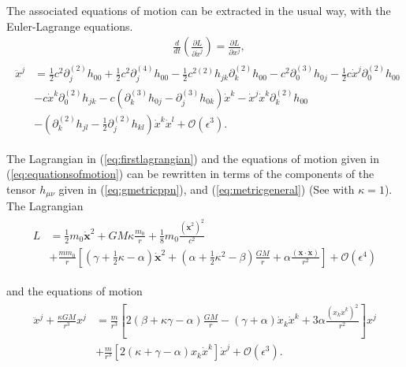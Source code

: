 The associated equations of motion can be extracted in the usual way, with the Euler-Lagrange equations.
\begin{align*}
	&\frac{d}{dt}\left(\frac{\partial L}{\partial \dot{x}^j}\right) = \frac{\partial L}{\partial x^j},
	\end{align*}
	\begin{align}
	\begin{split}
	\label{eq:equationsofmotion}
	\ddot{x}^j &= \frac{1}{2}c^2\partial_{j}^{(2)}h_{00}+\frac{1}{2}c^2\partial_{j}^{(4)}h_{00}-\frac{1}{2}c^{2(2)}h_{jk}\partial_{k}^{(2)}h_{00}-c^2 \partial_0^{(3)}h_{0j} -\frac{1}{2}c\dot{x}^j\partial_0^{(2)}h_{00} \\
	&-c\dot{x}^k\partial_0^{(2)}h_{jk}-c\left(\partial_k^{(3)}h_{0j}-\partial_j^{(3)}h_{0k}\right)\dot{x}^k
	-\dot{x}^j\dot{x}^k\partial_k^{(2)}h_{00} \\
	&- \left(\partial_k^{(2)}h_{jl}-\frac{1}{2}\partial_j^{(2)}h_{kl}\right)\dot{x}^k\dot{x}^l + \mathcal{O}(\epsilon^3).
	\end{split}
	\end{align}


The Lagrangian in (\ref{eq:firstlagrangian}) and the equations of motion given in (\ref{eq:equationsofmotion}) can be rewritten in terms of the components of the tensor $h_{\mu\nu}$ given in (\ref{eq:gmetricppn}), and (\ref{eq:metricgeneral}) (See \cite{Brumberg} with $\kappa = 1$).\\

The Lagrangian
\begin{align}
\begin{split}
L &= \frac{1}{2} m_0 \dot{\mathbf{x}}^2 +  GM \kappa \frac{m_0}{r}+ \frac{1}{8} m_0 \frac{(\dot{\mathbf{x}}^{2})^2}{c^2}  \\
&+ \frac{m m_0}{r}\left[\left(\gamma + \frac{1}{2}\kappa-\alpha \right) \dot{\mathbf{x}}^2+\left(\alpha + \frac{1}{2}\kappa^2-\beta \right)\frac{GM}{r}+\alpha \frac{\left(\mathbf{x}\cdot\mathbf{\dot{x}}\right)}{r^2}\right]+\mathcal{O}(\epsilon^4)
\end{split}
\end{align}

and the equations of motion
\begin{align*}
\begin{split}
\ddot{x}^j + \frac{\kappa GM}{r^3}x^j &= \frac{m}{r^3}\left[2(\beta + \kappa \gamma - \alpha)\frac{GM}{r}-(\gamma+\alpha)\dot{x}_k\dot{x}^k+ 3\alpha\frac{\left(x_k\dot{x}^k\right)^2}{r^2}\right]x^j\\
&+\frac{m}{r^3}\left[2(\kappa+\gamma - \alpha)x_k\dot{x}^k\right]\dot{x}^j+\mathcal{O}(\epsilon^3).
\end{split}
\end{align*}

